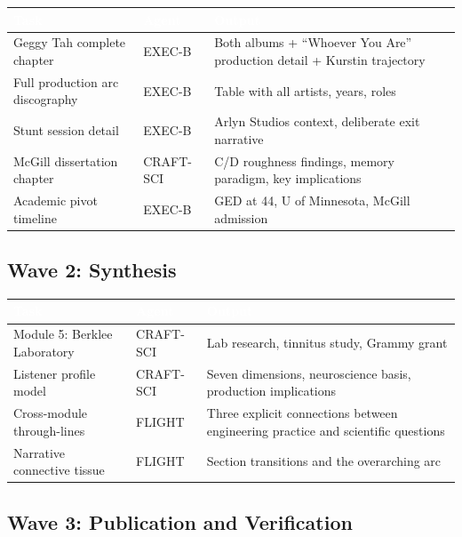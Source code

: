 \documentclass[11pt,letterpaper]{article}
\newcommand{\tableheader}[1]{\textbf{\sffamily\textcolor{white}{#1}}}
\begin{document}
\begin{center}
\begin{tabularx}{\textwidth}{L{4cm}L{3cm}X}
\toprule
{}
\tableheader{Task} & \tableheader{Agent} & \tableheader{Output} \\
\midrule
Geggy Tah complete chapter & EXEC-B & Both albums + ``Whoever You Are'' production detail + Kurstin trajectory \\
Full production arc discography & EXEC-B & Table with all artists, years, roles \\
Stunt session detail & EXEC-B & Arlyn Studios context, deliberate exit narrative \\
McGill dissertation chapter & CRAFT-SCI & C/D roughness findings, memory paradigm, key implications \\
Academic pivot timeline & EXEC-B & GED at 44, U of Minnesota, McGill admission \\
\bottomrule
\end{tabularx}
\end{center}

\subsection{Wave 2: Synthesis}

\begin{center}
\begin{tabularx}{\textwidth}{L{4cm}L{3cm}X}
\toprule
{}
\tableheader{Task} & \tableheader{Agent} & \tableheader{Output} \\
\midrule
Module 5: Berklee Laboratory & CRAFT-SCI & Lab research, tinnitus study, Grammy grant \\
Listener profile model & CRAFT-SCI & Seven dimensions, neuroscience basis, production implications \\
Cross-module through-lines & FLIGHT & Three explicit connections between engineering practice and scientific questions \\
Narrative connective tissue & FLIGHT & Section transitions and the overarching arc \\
\bottomrule
\end{tabularx}
\end{center}

\subsection{Wave 3: Publication and Verification}
\end{document}
